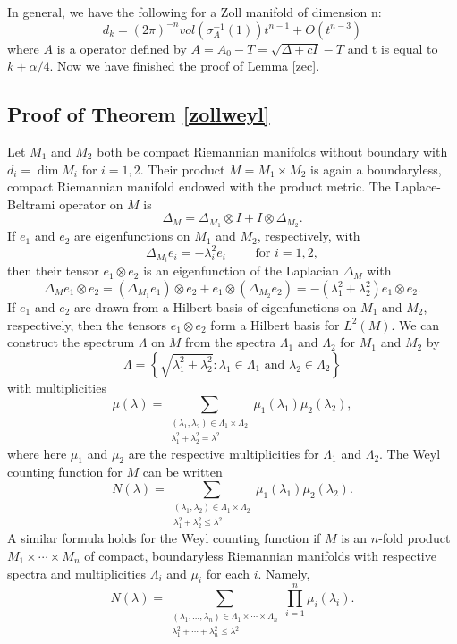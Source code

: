 \documentclass[10pt]{amsart}
\newcommand{\newsection}[1]
{\subsection{#1}\setcounter{theorem}{0} \setcounter{equation}{0}
\par\noindent}
\newcommand{\1}{\mathbb{1}}
\begin{document}
In general, we have the following for a Zoll manifold of dimension n:
\begin{equation}
    d_k = (2\pi)^{-n} vol(\sigma_A^{-1}(1)) t^{n -1} + O(t^{n-3})
\end{equation}
where $A$ is a operator defined by $A = A_0 -T = \sqrt{\Delta + cI} - T$ and t is equal to $k + \alpha/4$. Now we have finished the proof of Lemma \ref{zec}.

\newpage

\newsection{Proof of Theorem \ref{zollweyl}}

Let $M_1$ and $M_2$ both be compact Riemannian manifolds without boundary with $d_i = \dim M_i$ for $i = 1,2$. Their product $M = M_1 \times M_2$ is again a boundaryless, compact Riemannian manifold endowed with the product metric. The Laplace-Beltrami operator on $M$ is
\[
    \Delta_M = \Delta_{M_1} \otimes I + I \otimes \Delta_{M_2}.
\]
If $e_1$ and $e_2$ are eigenfunctions on $M_1$ and $M_2$, respectively, with
\[
    \Delta_{M_i} e_i = -\lambda_i^2 e_i \qquad \text{ for $i = 1,2$},
\]
then their tensor $e_1 \otimes e_2$ is an eigenfunction of the Laplacian $\Delta_M$ with
\[
    \Delta_M e_1 \otimes e_2 = (\Delta_{M_1} e_1) \otimes e_2 + e_1 \otimes (\Delta_{M_2} e_2) = -(\lambda_1^2 + \lambda_2^2)e_1 \otimes e_2.
\]
If $e_1$ and $e_2$ are drawn from a Hilbert basis of eigenfunctions on $M_1$ and $M_2$, respectively, then the tensors $e_1 \otimes e_2$ form a Hilbert basis for $L^2(M)$. We can construct the spectrum $\Lambda$ on $M$ from the spectra $\Lambda_1$ and $\Lambda_2$ for $M_1$ and $M_2$ by
\[
    \Lambda = \left\{\sqrt{\lambda_1^2 + \lambda_2^2} : \lambda_1 \in \Lambda_1 \text{ and } \lambda_2 \in \Lambda_2 \right\}
\]
with multiplicities
\[
    \mu(\lambda) = \sum_{\substack{(\lambda_1,\lambda_2) \in \Lambda_1 \times \Lambda_2 \\ \lambda_1^2 + \lambda_2^2 = \lambda^2}} \mu_1(\lambda_1) \mu_2(\lambda_2),
\]
where here $\mu_1$ and $\mu_2$ are the respective multiplicities for $\Lambda_1$ and $\Lambda_2$. The Weyl counting function for $M$ can be written
\[
    N(\lambda) = \sum_{\substack{(\lambda_1,\lambda_2) \in \Lambda_1 \times \Lambda_2 \\ \lambda_1^2 + \lambda_2^2 \leq \lambda^2}} \mu_1(\lambda_1) \mu_2(\lambda_2).
\]
A similar formula holds for the Weyl counting function if $M$ is an $n$-fold product $M_1 \times \cdots \times M_n$ of compact, boundaryless Riemannian manifolds with respective spectra and multiplicities $\Lambda_i$ and $\mu_i$ for each $i$. Namely,
\begin{equation}\label{product counting formula}
    N(\lambda) = \sum_{\substack{(\lambda_1,\ldots,\lambda_n) \in \Lambda_1 \times \cdots \times \Lambda_n \\ \lambda_1^2 + \cdots + \lambda_n^2 \leq \lambda^2}} \prod_{i = 1}^n \mu_i(\lambda_i).
\end{equation}
\end{document}
